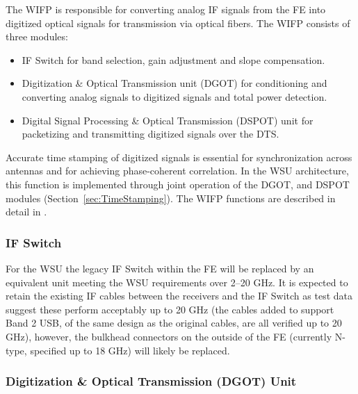 The \ac{WIFP} is responsible for converting analog \ac{IF} signals from the \ac{FE} into digitized optical signals for transmission via optical fibers.
The \ac{WIFP} consists of three modules:
\begin{itemize}[itemsep=-0.5em]
    \item IF Switch for band selection, gain adjustment and slope compensation.
    \item Digitization \& Optical Transmission unit (\ac{DGOT}) for conditioning and converting analog signals to digitized signals and total power detection.
    \item Digital Signal Processing \& Optical Transmission (\ac{DSPOT}) unit for packetizing and transmitting digitized signals over the DTS.
\end{itemize}
Accurate time stamping of digitized signals is essential for synchronization across antennas and for achieving phase-coherent correlation.
In the \ac{WSU} architecture, this function is implemented through joint operation of the \ac{DGOT}, and \ac{DSPOT} modules (Section~\ref{sec:TimeStamping}).
The \ac{WIFP} functions are described in detail in \cite{WIFPDescription}.

\subsubsection{IF Switch}

For the WSU the legacy IF Switch within the FE will be replaced by an equivalent unit meeting the WSU requirements over 2--20 GHz. It is expected to retain the existing IF cables between the receivers and the IF Switch as test data suggest these perform acceptably up to 20 GHz (the cables added to support Band 2 USB, of the same design as the original cables, are all verified up to 20 GHz), however, the bulkhead connectors on the outside of the FE (currently N-type, specified up to 18 GHz) will likely be replaced.


\subsubsection{Digitization \& Optical Transmission (DGOT) Unit}

